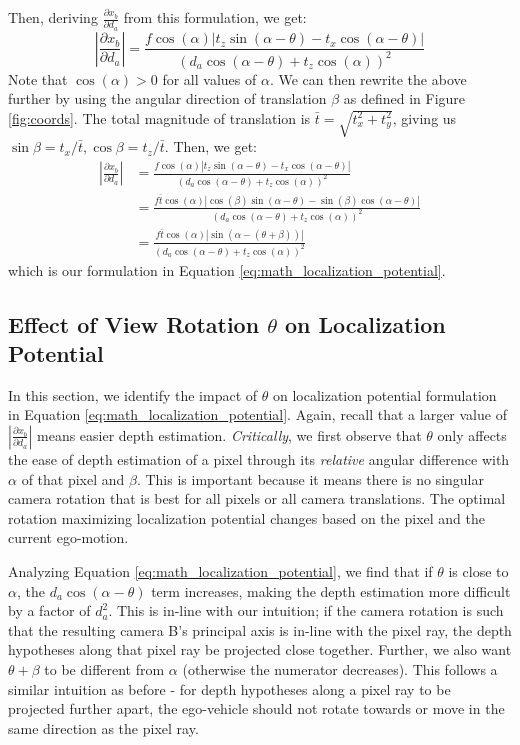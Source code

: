 \documentclass[runningheads, hyperfootnotes=false]{article}
\begin{document}
Then, deriving $\frac{\partial x_b}{\partial d_a}$ from this formulation, we get:
\[
\left\lvert \frac{\partial x_b}{\partial d_a} \right\rvert = \frac{f \cos(\alpha) |t_z \sin(\alpha - \theta) - t_x \cos(\alpha - \theta)|}{(d_a \cos(\alpha - \theta) + t_z\cos(\alpha))^2}
\]
Note that $\cos(\alpha) > 0$ for all values of $\alpha$. We can then rewrite the above further by using the angular direction of translation $\beta$ as defined in Figure \ref{fig:coords}. The total magnitude of translation is $\bar{t} = \sqrt{t_x^2 + t_y^2}$, giving us $\sin{\beta} = t_x/\bar{t}, \cos{\beta} = t_z/\bar{t}$. Then, we get:
\begin{align*}
    \left\lvert \frac{\partial x_b}{\partial d_a} \right\rvert &= \frac{f \cos(\alpha) |t_z \sin(\alpha - \theta) - t_x \cos(\alpha - \theta)|}{(d_a \cos(\alpha - \theta) + t_z\cos(\alpha))^2} \\
    &= \frac{f \bar{t} \cos(\alpha) |\cos(\beta) \sin(\alpha - \theta) - \sin(\beta) \cos(\alpha - \theta)|}{(d_a \cos(\alpha - \theta) + t_z\cos(\alpha))^2} \\
    &= \frac{f \bar{t} \cos(\alpha) |\sin(\alpha - (\theta + \beta))|}{(d_a \cos(\alpha - \theta) + t_z\cos(\alpha))^2}
\end{align*}
which is our formulation in Equation \ref{eq:math_localization_potential}.

\subsection{Effect of View Rotation $\theta$ on Localization Potential}\label{app:theory_rot}
In this section, we identify the impact of $\theta$ on localization potential formulation in Equation \ref{eq:math_localization_potential}. Again, recall that a larger value of $\left\lvert \frac{\partial x_b}{\partial d_a} \right\rvert$ means easier depth estimation. \textit{Critically}, we first observe that $\theta$ only affects the ease of depth estimation of a pixel through its \textit{relative} angular difference with $\alpha$ of that pixel and $\beta$. This is important because it means there is no singular camera rotation that is best for all pixels or all camera translations. The optimal rotation maximizing localization potential changes based on the pixel and the current ego-motion.

Analyzing Equation \ref{eq:math_localization_potential}, we find that if $\theta$ is close to $\alpha$, the $d_a\cos(\alpha - \theta)$ term increases, making the depth estimation more difficult by a factor of $d_a^2$. This is in-line with our intuition; if the camera rotation is such that the resulting camera B's principal axis is in-line with the pixel ray, the depth hypotheses along that pixel ray be projected close together. Further, we also want $\theta + \beta$ to be different from $\alpha$ (otherwise the numerator decreases). This follows a similar intuition as before - for depth hypotheses along a pixel ray to be projected further apart, the ego-vehicle should not rotate towards or move in the same direction as the pixel ray. 
\end{document}
